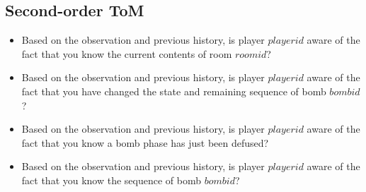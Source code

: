 \documentclass[11pt]{article}
\begin{document}
\subsection{Second-order ToM}
\begin{itemize}
  \item Based on the observation and previous history, is player ${player id}$ aware of the fact that you know the current contents of room ${room id}$?
  \item Based on the observation and previous history, is player ${player id}$ aware of the fact that you have changed the state and remaining sequence of bomb ${bomb id}$?
\item Based on the observation and previous history, is player ${player id}$ aware of the fact that you know a bomb phase has just been defused?
\item Based on the observation and previous history, is player ${player id}$ aware of the fact that you know the sequence of bomb ${bomb id}$?
\end{itemize}
\end{document}
